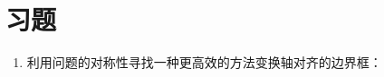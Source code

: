 \section{习题}\label{sec:习题02}

\begin{enumerate}
    \item \circleone 利用问题的对称性寻找一种更高效的方法变换轴对齐的边界框：
\end{enumerate}